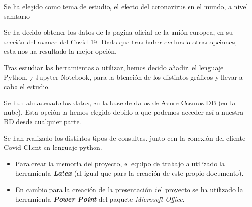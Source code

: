 \documentclass[idxtotoc,hyperref,openany]{labbook} %
\begin{document}
Se ha elegido como tema de estudio, el efecto del coronavirus en el mundo, a nivel sanitario


Se ha decido obtener los datos de la pagina oficial de la unión europea, en su sección del avance del Covid-19. Dado que tras haber evaluado otras opciones, esta nos ha resultado la mejor opción.

Tras estudiar las herramientas a utilizar, hemos decido añadir, el lenguaje Python, y Jupyter Notebook, para la btención de los distintos gráficos y llevar a cabo el estudio.


Se han almacenado los datos, en la base de datos de Azure Cosmos DB (en la nube). Esta opción la hemos elegido debido a que podemos acceder así a nuestra BD desde cualquier parte.


Se han realizado los distintos tipos de consultas. junto con la conexión del cliente Covid-Client en lenguaje python.


\begin{itemize}
	\item Para crear la memoria del proyecto, el equipo de trabajo a utilizado la herramienta \textit{\textbf{Latex}} (al igual que para la creación de este propio documento).
	
	\item  En cambio para la creación de la presentación del proyecto se ha utilizado la herramienta \textbf{\textit{Power Point}} del paquete \textit{Microsoft Office}.
	
\end{itemize}




\end{document}
